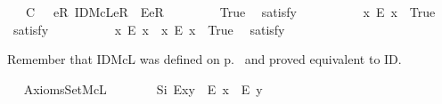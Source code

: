 \begin{isabellebody}
\ \ \ C\ {\isacharcolon}\ {\isachardoublequoteopen}\isactrlbold {\isasymforall}{\isasymgamma}{\isachardot}\ \isactrlbold {\isasymexists}eR{\isachardot}\ IDMcL{\isacharparenleft}eR{\isacharparenright}\ \isactrlbold {\isasymand}\ E{\isacharparenleft}eR{\isasymcdot}{\isasymgamma}{\isacharparenright}{\isachardoublequoteclose}\ \isanewline
\ \ \isanewline
\ \ \ \isamarkupfalse%
\ True\ \isamarkupfalse%
\ {\isacharbrackleft}satisfy{\isacharbrackright}%
\isadelimproof
\ %
\endisadelimproof
%
\isatagproof
{}\isamarkupfalse%
\ \ %
%
\endisatagproof
{\isafoldproof}%
%
\isadelimproof
%
\endisadelimproof
\isanewline
\ \ \ \isamarkupfalse%
\ \ {\isachardoublequoteopen}{\isasymexists}x{\isachardot}\ \isactrlbold {\isasymnot}{\isacharparenleft}E\ x{\isacharparenright}{\isachardoublequoteclose}\ \ True\ \isamarkupfalse%
\ {\isacharbrackleft}satisfy{\isacharbrackright}%
\isadelimproof
\ %
\endisadelimproof
%
\isatagproof
{}\isamarkupfalse%
\ \ %
%
\endisatagproof
{\isafoldproof}%
%
\isadelimproof
%
\endisadelimproof
\isanewline
\ \ \ \isamarkupfalse%
\ \ {\isachardoublequoteopen}{\isacharparenleft}{\isasymexists}x{\isachardot}\ \isactrlbold {\isasymnot}{\isacharparenleft}E\ x{\isacharparenright}{\isacharparenright}\ {\isasymand}\ {\isacharparenleft}{\isasymexists}x{\isachardot}\ {\isacharparenleft}E\ x{\isacharparenright}{\isacharparenright}{\isachardoublequoteclose}\ \ True\ \isamarkupfalse%
\ {\isacharbrackleft}satisfy{\isacharbrackright}%
\isadelimproof
\ %
\endisadelimproof
%
\isatagproof
{}\isamarkupfalse%
\ \ %
%
\endisatagproof
{\isafoldproof}%
%
\isadelimproof
%
\endisadelimproof
\isanewline
\ \ \isamarkupfalse%
%
\begin{isamarkuptext}%
Remember that IDMcL  was defined on p.~\pageref{IDMcL} and proved
       equivalent to ID.%
\end{isamarkuptext}\isamarkuptrue%
%
\isamarkuptrue%
\ \isamarkupfalse%
\ AxiomsSetMcL\isanewline
\ \ \isanewline
\ \ \ \isamarkupfalse%
\ S\isactrlsub i{\isacharcolon}\ {\isachardoublequoteopen}E{\isacharparenleft}x{\isasymcdot}y{\isacharparenright}\ \isactrlbold {\isasymrightarrow}\ {\isacharparenleft}E\ x\ \isactrlbold {\isasymand}\ E\ y{\isacharparenright}{\isachardoublequoteclose}%

\end{isabellebody}
